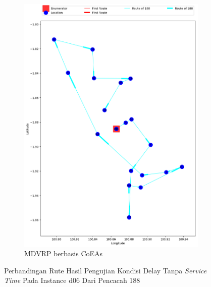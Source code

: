 \begin{figure}[H]
	\centering
	\begin{subfigure}[t]{\textwidth}
		\centering
		\includegraphics[width=\textwidth]{Resources/Images/delayed_6/real_m15_n100_delayed_6_188_coes}
		\caption{MDVRP berbasis CoEAs}
		\label{fig:real_m15_n100_delayed_6_188_coes}
	\end{subfigure}
	\caption{Perbandingan Rute Hasil Pengujian Kondisi Delay Tanpa \textit{Service Time} Pada Instance d06 Dari Pencacah 188}
	\label{fig:real_m15_n100_delayed_6_188}
\end{figure}


